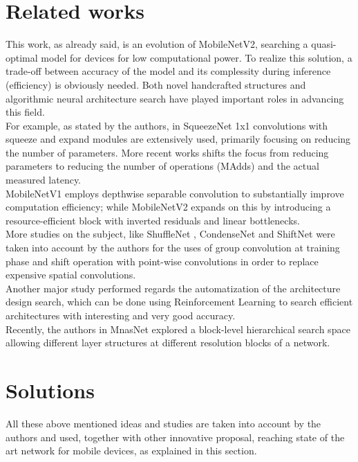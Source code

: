 \documentclass[12pt, letterpaper, twoside]{article}
\begin{document}
\section{Related works}
This work, as already said, is an evolution of MobileNetV2, searching a quasi-optimal model for devices for low computational power. To realize this solution, a trade-off between accuracy of the model and its complessity during inference (efficiency) is obviously needed. Both novel handcrafted structures and algorithmic neural architecture search have played important roles in advancing this field.\\

For example, as stated by the authors, in SqueezeNet \cite{iandola2016squeezenet} 1x1 convolutions with squeeze and expand modules are extensively used, primarily focusing on reducing the number of parameters. More recent works shifts the focus from reducing parameters to reducing the number of operations (MAdds) and the actual measured latency. \\ 
MobileNetV1 \cite{howard2017mobilenets} employs depthwise separable convolution to substantially improve computation efficiency; while MobileNetV2 \cite{sandler2019mobilenetv2} expands on this by introducing a resource-efficient block with inverted residuals and linear bottlenecks. \\
More studies on the subject, like ShuffleNet \cite{zhang2017shufflenet}, CondenseNet \cite{huang2018condensenet} and ShiftNet \cite{yan2018shiftnet} were taken into account by the authors for the uses of group convolution at training phase and shift operation with point-wise convolutions in order to replace expensive spatial convolutions. \\

Another major study performed regards the automatization of the architecture design search, which can be done using Reinforcement Learning to search efficient architectures with interesting and very good accuracy.\\
Recently, the authors in MnasNet \cite{tan2019mnasnet} explored a block-level hierarchical search space allowing different layer structures at different resolution blocks of a network.\\

\clearpage
\section{Solutions}
All these above mentioned ideas and studies are taken into account by the authors and used, together with other innovative proposal, reaching state of the art network for mobile devices, as explained in this section.
\end{document}
